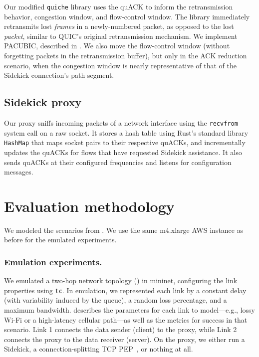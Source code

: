Our modified \texttt{quiche} library uses the quACK to inform the
retransmission behavior, congestion window, and flow-control window. The library
immediately retransmits lost \emph{frames} in a newly-numbered
packet, as opposed to the lost \emph{packet}, similar to QUIC's original
retransmission mechanism. We implement PACUBIC,
described in .
We also move the flow-control window (without forgetting packets in the
retransmission buffer), but only in the ACK reduction scenario, when the
congestion window is nearly representative of that of the Sidekick connection's
path segment.

\subsection{Sidekick proxy}
\label{sec:sidekick:implementation:proxy}

Our proxy sniffs incoming packets of a network interface using the
\texttt{recvfrom} system call on a raw socket.
It stores a hash table using Rust's standard library \texttt{HashMap} that maps
socket pairs to their respective quACKs, and incrementally updates the quACKs
for flows that have requested Sidekick assistance. It also sends quACKs at
their configured frequencies and listens for configuration messages.

\section{Evaluation methodology}
\label{sec:sidekick:methodology}



We modeled the scenarios from . We use the same
m4.xlarge AWS instance as before for the emulated experiments.

\subsubsection{Emulation experiments.}

We emulated a two-hop network topology () in
mininet, configuring the link properties using \texttt{tc}.
In emulation, we represented
each link by a constant delay (with variability induced by the queue), a random
loss percentage, and a maximum bandwidth.
 describes the parameters
for each link to model---e.g., lossy Wi-Fi or a high-latency cellular
path---as well as the metrics for success in that scenario.
Link 1 connects the data sender (client) to the proxy,
while Link 2 connects the proxy to the data receiver (server).
On the proxy, we either run a Sidekick,
a connection-splitting TCP PEP~\cite{caini2006pepsal}, or nothing at all.

